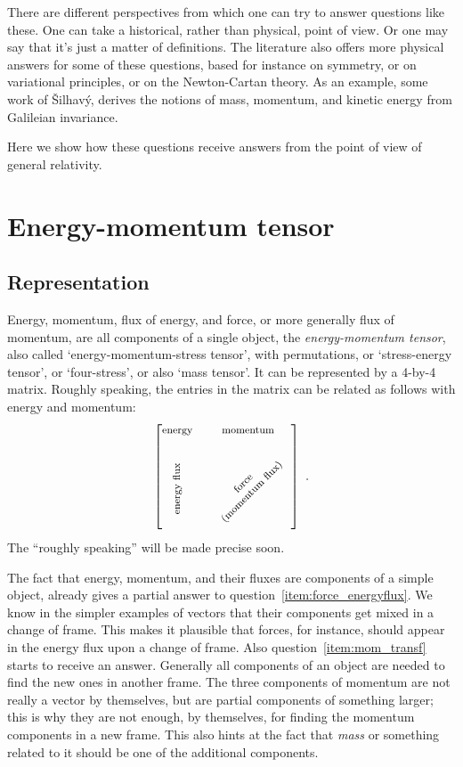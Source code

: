 \documentclass[\ifafour a4paper,12pt,\else a5paper,10pt,\fi%
onecolumn,oneside,article,%
british%
]{memoir}
\renewcommand*{\|}[1][]{\nonscript\:#1\vert\nonscript\:\mathopen{}}
\begin{document}
There are different perspectives from which one can try to answer questions like these. One can take a historical, rather than physical, point of view. Or one may say that it's just a matter of definitions. The literature also offers more physical answers for some of these questions, based for instance on symmetry, or on variational principles, or on the Newton-Cartan theory. As an example, some work of \v{S}ilhav\'y\autocites{silhavy1989,silhavy1992}[see also][]{serrin1995b_r1998}, derives the notions of mass, momentum, and kinetic energy from Galileian invariance.

Here we show how these questions receive answers from the point of view of general relativity.

\section{Energy-momentum tensor}
\label{sec:energy_momentum_tensor}

\subsection{Representation}
\label{sec:EMt_representation}

Energy, momentum, flux of energy, and force, or more generally flux of momentum, are all components of a single object, the \emph{energy-momentum tensor}, also called \enquote*{energy-momentum-stress tensor}, with permutations, or \enquote*{stress-energy tensor}, or \enquote*{four-stress}, or also \enquote*{mass tensor}. It can be represented by a 4-by-4 matrix. Roughly speaking, the entries in the matrix can be related as follows with energy and momentum:
\begin{equation}
  \label{eq:energy_momentum_entries}
  \begin{bmatrix}
    \text{\footnotesize energy} &
    \text{\footnotesize momentum} \\[2\jot]
    \rotatebox[origin=c]{90}{\text{\footnotesize energy flux}} &
    \rotatebox[origin=c]{45}{\parbox{8em}{\centering\footnotesize force\\ (momentum flux)}}
  \end{bmatrix} \ .
\end{equation}
The \enquote{roughly speaking} will be made precise soon.

The fact that energy, momentum, and their fluxes are components of a simple object, already gives a partial answer to question~\ref{item:force_energyflux}. We know in the simpler examples of vectors that their components get mixed in a change of frame. This makes it plausible that forces, for instance, should appear in the energy flux upon a change of frame. Also question~\ref{item:mom_transf} starts to receive an answer. Generally all components of an object are needed to find the new ones in another frame. The three components of momentum are not really a vector by themselves, but are partial components of something larger; this is why they are not enough, by themselves, for finding the momentum components in a new frame. This also hints at the fact that \emph{mass} or something related to it should be one of the additional components.
\end{document}
